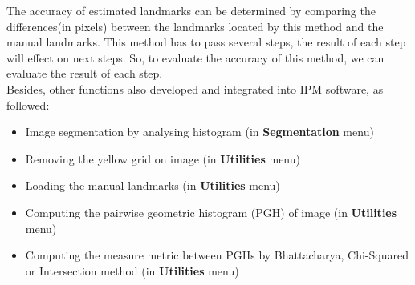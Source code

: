 The accuracy of estimated landmarks can be determined by comparing the differences(in pixels) between the landmarks located by this method and the manual landmarks. This method has to pass several steps, the result of each step will effect on next steps. So, to evaluate the accuracy of this method, we can evaluate the result of each step.\\
Besides, other functions also developed and integrated into IPM software, as followed:
\begin{itemize}
\item Image segmentation by analysing histogram (in \textbf{Segmentation} menu)
\item Removing the yellow grid on image (in \textbf{Utilities} menu)
\item Loading the manual landmarks (in \textbf{Utilities} menu)
\item Computing the pairwise geometric histogram (PGH) of image (in \textbf{Utilities} menu)
\item Computing the measure metric between PGHs by Bhattacharya, Chi-Squared or Intersection method (in \textbf{Utilities} menu)
\end{itemize}


